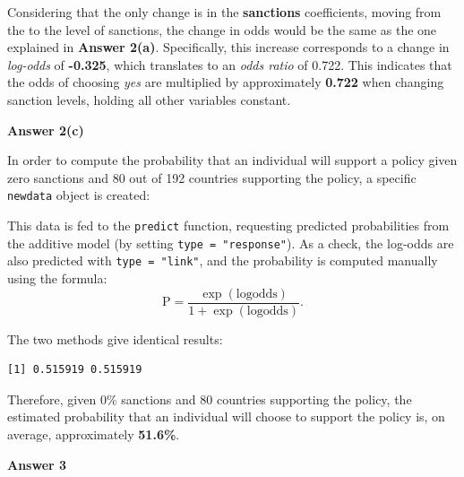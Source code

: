 \documentclass[12pt,letterpaper]{article}
\begin{document}
\noindent Considering that the only change is in the \textbf{sanctions} coefficients, moving from the  to the  level of sanctions, the change in odds would be the same as the one explained in \textbf{Answer 2(a)}. 
\noindent Specifically, this increase corresponds to a change in \emph{log-odds} of \textbf{-0.325}, which translates to an \emph{odds ratio} of 0.722. This indicates that the odds of choosing \emph{yes} are multiplied by approximately \textbf{0.722} when changing sanction levels, holding all other variables constant.

\vspace{1cm}

\textbf{Answer 2(c)}\\
\vspace{0.5cm}

\noindent In order to compute the probability that an individual will support a policy given zero sanctions and 80 out of 192 countries supporting the policy, a specific \texttt{newdata} object is created:

\vspace{0.5cm}


\vspace{0.5cm}
\noindent This data is fed to the \texttt{predict} function, requesting predicted probabilities from the additive model (by setting \texttt{type = "response"}). As a check, the log-odds are also predicted with \texttt{type = "link"}, and the probability is computed manually using the formula:
\[
\text{P} = \frac{\exp(\text{logodds})}{1 + \exp(\text{logodds})}.
\]

\vspace{0.5cm}


\vspace{0.5cm}
\noindent The two methods give identical results: 
\begin{verbatim}
[1] 0.515919 0.515919
\end{verbatim}

\noindent Therefore, given 0\% sanctions and 80 countries supporting the policy, the estimated probability that an individual will choose to support the policy is, on average, approximately \textbf{51.6\%}.

\vspace{1cm}

\textbf{Answer 3}\\
\vspace{0.5cm}
\end{document}
